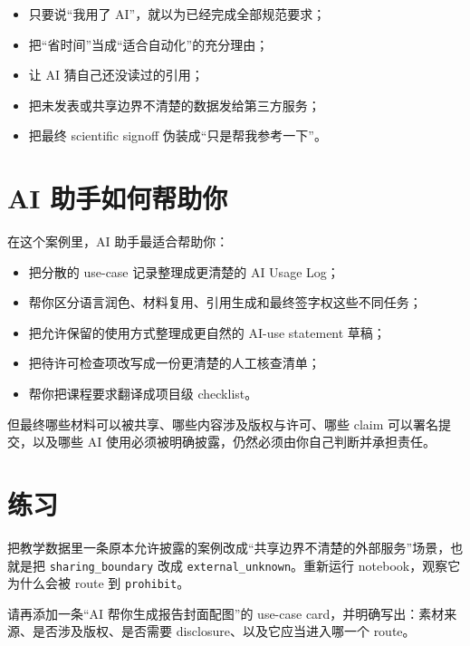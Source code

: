 \begin{warnbox}[AI 伦理与科研规范中的常见误区]
\begin{itemize}
    \item 只要说“我用了 AI”，就以为已经完成全部规范要求；
    \item 把“省时间”当成“适合自动化”的充分理由；
    \item 让 AI 猜自己还没读过的引用；
    \item 把未发表或共享边界不清楚的数据发给第三方服务；
    \item 把最终 scientific signoff 伪装成“只是帮我参考一下”。
\end{itemize}
\end{warnbox}

\section{AI 助手如何帮助你}

在这个案例里，AI 助手最适合帮助你：

\begin{itemize}
    \item 把分散的 use-case 记录整理成更清楚的 AI Usage Log；
    \item 帮你区分语言润色、材料复用、引用生成和最终签字权这些不同任务；
    \item 把允许保留的使用方式整理成更自然的 AI-use statement 草稿；
    \item 把待许可检查项改写成一份更清楚的人工核查清单；
    \item 帮你把课程要求翻译成项目级 checklist。
\end{itemize}

但最终哪些材料可以被共享、哪些内容涉及版权与许可、哪些 claim 可以署名提交，以及哪些 AI 使用必须被明确披露，仍然必须由你自己判断并承担责任。

\section{练习}

\begin{exercisebox}[基础练习]
把教学数据里一条原本允许披露的案例改成“共享边界不清楚的外部服务”场景，也就是把 \texttt{sharing\_boundary} 改成 \texttt{external\_unknown}。重新运行 notebook，观察它为什么会被 route 到 \texttt{prohibit}。
\end{exercisebox}

\begin{exercisebox}[进阶练习]
请再添加一条“AI 帮你生成报告封面配图”的 use-case card，并明确写出：素材来源、是否涉及版权、是否需要 disclosure、以及它应当进入哪一个 route。
\end{exercisebox}

